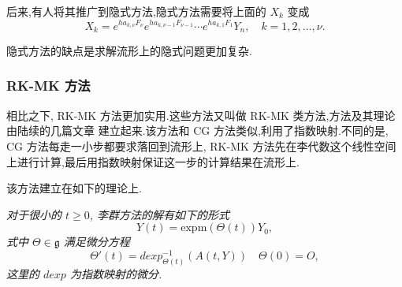 后来,有人将其推广到隐式方法,隐式方法需要将上面的 $X_k$ 变成
\begin{equation*}
	X_k=e^{ha_{k,\nu}F_{\nu}}e^{ha_{k,\nu-1}F_{\nu-1}}\cdots e^{ha_{k,1}F_{1}}Y_n,\quad k=1,2,\ldots,\nu.
\end{equation*}

隐式方法的缺点是求解流形上的隐式问题更加复杂.

\subsubsection{RK-MK 方法}
相比之下, RK-MK 方法更加实用.这些方法又叫做 RK-MK 类方法,方法及其理论由陆续的几篇文章 \cite{mk1996lie,mk1997numerical,mk1998runge,mk1999high} 建立起来.该方法和 CG 方法类似,利用了指数映射.不同的是, CG 方法每走一小步都要求落回到流形上, RK-MK 方法先在李代数这个线性空间上进行计算,最后用指数映射保证这一步的计算结果在流形上.

该方法建立在如下的理论上.
\begin{theorem}
	\emph{对于很小的 $t\geq 0$, 李群方法的解有如下的形式
	\begin{equation*}
		Y(t)=\mbox{expm}(\Theta(t))Y_0,
	\end{equation*}
	式中 $\Theta \in \mathfrak{g}$ 满足微分方程
	\begin{equation*}
		\Theta'(t)=dexp_{\Theta(t)}^{-1}(A(t,Y))\quad \Theta(0)=O,
	\end{equation*}
	这里的 $dexp$ 为指数映射的微分.}
\end{theorem}

